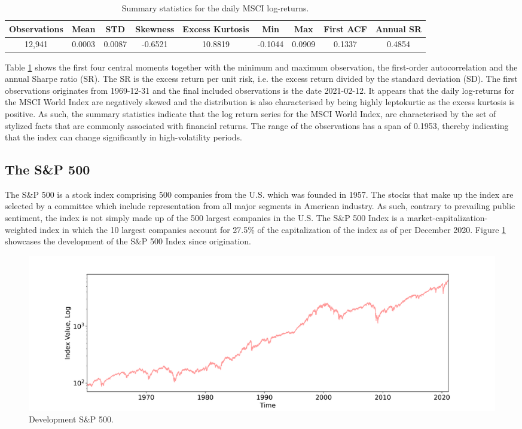 \begin{table}[H]
\caption{Summary statistics for the daily MSCI log-returns.}
\centering
\begin{tabular}{c c c c c c c c c} 
\hline\hline
Observations & Mean & STD & Skewness & Excess Kurtosis & Min & Max & First ACF & Annual SR \\
\hline
12,941 & 0.0003 & 0.0087 & -0.6521 & 10.8819 & -0.1044 & 0.0909 & 0.1337 & 0.4854 \\
\hline
\end{tabular}
\label{tab:summary_stats_MSCI}
\end{table}

Table \ref{tab:summary_stats_MSCI} shows the first four central moments together with the minimum and maximum observation, the first-order autocorrelation and the annual Sharpe ratio (SR). The SR is the excess return per unit risk, i.e. the excess return divided by the standard deviation (SD). The first observations originates from 1969-12-31 and the final included observations is the date 2021-02-12. It appears that the daily log-returns for the MSCI World Index are negatively skewed and the distribution is also characterised by being highly leptokurtic as the excess kurtosis is positive. As such, the summary statistics indicate that the log return series for the MSCI World Index, are characterised by the set of stylized facts that are commonly associated with financial returns. The range of the observations has a span of 0.1953, thereby indicating that the index can change significantly in high-volatility periods.    
 
\subsection{The S\&P 500}
The S\&P 500 is a stock index comprising 500 companies from the U.S. which was founded in 1957. The stocks that make up the index are selected by a committee which include representation from all major segments in American industry. As such, contrary to prevailing public sentiment, the index is not simply made up of the 500 largest companies in the U.S. The S\&P 500 Index is a market-capitalization-weighted index in which the 10 largest companies account for 27.5\% of the capitalization of the index as of per December 2020. Figure \ref{fig: SP500_index} showcases the development of the S\&P 500 Index since origination. 
 
\begin{figure}[H] 
    \centering
    \includegraphics[width=1\textwidth]{analysis/data_description/images/SP500_index.png}
    \caption{Development S\&P 500.}
    \label{fig: SP500_index}
\end{figure}

